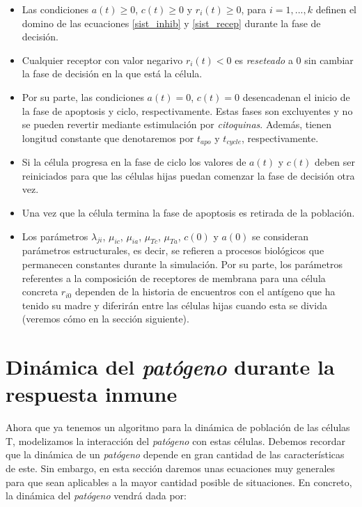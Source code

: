 \begin{itemize}
	\item Las condiciones $a(t)\geq0$, $c(t)\geq0$ y $r_i(t)\geq0$, para $i=1,...,k$ definen el domino de las ecuaciones \ref{sist_inhib} y \ref{sist_recep} durante la fase de decisión. 
	
	\item Cualquier receptor con valor negarivo $r_i(t) < 0$ es \textit{reseteado} a $0$ sin cambiar la fase de decisión en la que está la célula.
	
	\item Por su parte, las condiciones $a(t)=0$, $c(t)=0$ desencadenan el inicio de la fase de apoptosis y ciclo, respectivamente. Estas fases son excluyentes y no se pueden revertir mediante estimulación por \textit{citoquinas}. Además, tienen longitud constante que denotaremos por $t_{apo}$ y $t_{cycle}$, respectivamente.
	
	\item Si la célula progresa en la fase de ciclo los valores de $a(t)$ y $c(t)$ deben ser reiniciados para que las células hijas puedan comenzar la fase de decisión otra vez. 
	
	\item Una vez que la célula termina la fase de apoptosis es retirada de la población.
	
	\item Los parámetros $\lambda_{ji}$, $\mu_{ic}$, $\mu_{ia}$, $\mu_{Tc}$, $\mu_{Ta}$, $c(0)$ y $a(0)$ se consideran parámetros estructurales, es decir, se refieren a procesos biológicos que permanecen constantes durante la simulación. Por su parte, los parámetros referentes a la composición de receptores de membrana para una célula concreta $r_{i0}$ dependen de la historia de encuentros con el antígeno que ha tenido su madre y diferirán entre las células hijas cuando esta se divida (veremos cómo en la sección siguiente).
\end{itemize}


\section{Dinámica del \textit{patógeno} durante la respuesta inmune}
\label{sec:modeloPatCelT}

Ahora que ya tenemos un algoritmo para la dinámica de población de las células T, modelizamos la interacción del \textit{patógeno} con estas células. Debemos recordar que la dinámica de un \textit{patógeno} depende en gran cantidad de las características de este. Sin embargo, en esta sección daremos unas ecuaciones muy generales para que sean aplicables a la mayor cantidad posible de situaciones. En concreto, la dinámica del \textit{patógeno} vendrá dada por:

